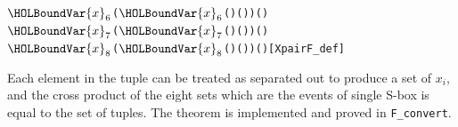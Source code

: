 \documentclass{article}
\begin{document}
\begin{alltt}
       \ensuremath{\HOLBoundVar{x}\sb{\mathrm{6}}} \HOLSymConst{\HOLTokenEor{}}  (\ensuremath{\HOLBoundVar{x}\sb{\mathrm{6}}} \HOLSymConst{\HOLTokenEor{}} ( \HOLSymConst{\HOLTokenExtract{}} ) ( )) \HOLSymConst{=} ( \HOLSymConst{\HOLTokenExtract{}} )  \HOLSymConst{\HOLTokenConj{}}
       \ensuremath{\HOLBoundVar{x}\sb{\mathrm{7}}} \HOLSymConst{\HOLTokenEor{}}  (\ensuremath{\HOLBoundVar{x}\sb{\mathrm{7}}} \HOLSymConst{\HOLTokenEor{}} ( \HOLSymConst{\HOLTokenExtract{}} ) ( )) \HOLSymConst{=} ( \HOLSymConst{\HOLTokenExtract{}} )  \HOLSymConst{\HOLTokenConj{}}
       \ensuremath{\HOLBoundVar{x}\sb{\mathrm{8}}} \HOLSymConst{\HOLTokenEor{}}  (\ensuremath{\HOLBoundVar{x}\sb{\mathrm{8}}} \HOLSymConst{\HOLTokenEor{}} ( \HOLSymConst{\HOLTokenExtract{}} ) ( )) \HOLSymConst{=} ( \HOLSymConst{\HOLTokenExtract{}} ) \HOLTokenRightbrace{}\hfill{[XpairF_def]}
\end{alltt}

Each element in the tuple can be treated as separated out to produce a set of $x_i$, and the cross product of the
eight sets which are the events of single S-box is equal to the set of tuples. The theorem is implemented and proved
in \verb|F_convert|.
\end{document}
